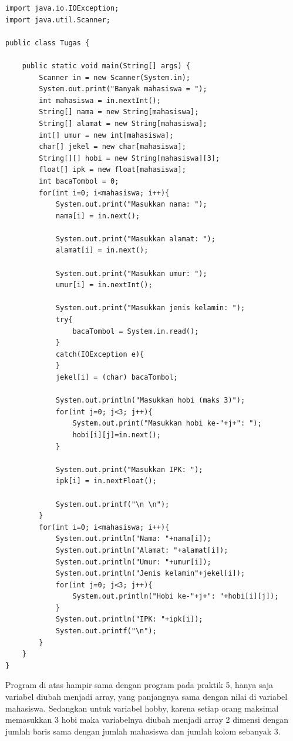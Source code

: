 \documentclass[a4paper,12pt]{article}
\begin{document}
\begin{lstlisting}
import java.io.IOException;
import java.util.Scanner;

public class Tugas {

    public static void main(String[] args) {
        Scanner in = new Scanner(System.in);
        System.out.print("Banyak mahasiswa = ");
        int mahasiswa = in.nextInt();
        String[] nama = new String[mahasiswa];
        String[] alamat = new String[mahasiswa];
        int[] umur = new int[mahasiswa];
        char[] jekel = new char[mahasiswa];
        String[][] hobi = new String[mahasiswa][3];
        float[] ipk = new float[mahasiswa];
        int bacaTombol = 0;
        for(int i=0; i<mahasiswa; i++){
            System.out.print("Masukkan nama: ");
            nama[i] = in.next();

            System.out.print("Masukkan alamat: ");
            alamat[i] = in.next();

            System.out.print("Masukkan umur: ");
            umur[i] = in.nextInt();

            System.out.print("Masukkan jenis kelamin: ");
            try{
                bacaTombol = System.in.read();
            }
            catch(IOException e){
            }
            jekel[i] = (char) bacaTombol;

            System.out.println("Masukkan hobi (maks 3)");
            for(int j=0; j<3; j++){
                System.out.print("Masukkan hobi ke-"+j+": ");
                hobi[i][j]=in.next();
            }

            System.out.print("Masukkan IPK: ");
            ipk[i] = in.nextFloat();

            System.out.printf("\n \n");
        }
        for(int i=0; i<mahasiswa; i++){
            System.out.println("Nama: "+nama[i]);
            System.out.println("Alamat: "+alamat[i]);
            System.out.println("Umur: "+umur[i]);
            System.out.println("Jenis kelamin"+jekel[i]);
            for(int j=0; j<3; j++){
                System.out.println("Hobi ke-"+j+": "+hobi[i][j]);
            }
            System.out.println("IPK: "+ipk[i]);
            System.out.printf("\n");
        }
    }
}
\end{lstlisting}

Program di atas hampir sama dengan program pada praktik 5, hanya saja variabel
diubah menjadi array, yang panjangnya sama dengan nilai di variabel mahasiswa.
Sedangkan untuk variabel hobby, karena setiap orang maksimal memasukkan 3 hobi
maka variabelnya diubah menjadi array 2 dimensi dengan jumlah baris sama dengan
jumlah mahasiswa dan jumlah kolom sebanyak 3.\\
\end{document}
